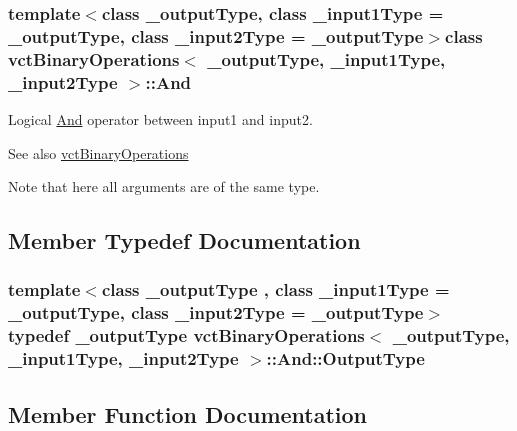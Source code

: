 \subsubsection*{template$<$class \+\_\+output\+Type, class \+\_\+input1\+Type = \+\_\+output\+Type, class \+\_\+input2\+Type = \+\_\+output\+Type$>$class vct\+Binary\+Operations$<$ \+\_\+output\+Type, \+\_\+input1\+Type, \+\_\+input2\+Type $>$\+::\+And}

Logical \hyperlink{classvct_binary_operations_1_1_and}{And} operator between input1 and input2. 

\begin{DoxySeeAlso}{See also}
\hyperlink{classvct_binary_operations}{vct\+Binary\+Operations}
\end{DoxySeeAlso}
Note that here all arguments are of the same type. 

\subsection{Member Typedef Documentation}
\hypertarget{classvct_binary_operations_1_1_and_a266e94b9b9630c9e1f7527e5083c1384}{}
\subsubsection[{Output\+Type}]{\setlength{\rightskip}{0pt plus 5cm}template$<$class \+\_\+output\+Type , class \+\_\+input1\+Type  = \+\_\+output\+Type, class \+\_\+input2\+Type  = \+\_\+output\+Type$>$ typedef \+\_\+output\+Type {\bf vct\+Binary\+Operations}$<$ \+\_\+output\+Type, \+\_\+input1\+Type, \+\_\+input2\+Type $>$\+::{\bf And\+::\+Output\+Type}}\label{classvct_binary_operations_1_1_and_a266e94b9b9630c9e1f7527e5083c1384}


\subsection{Member Function Documentation}
\hypertarget{classvct_binary_operations_1_1_and_a6f5b7a04f80a8501d5423983957eecb7}{}
